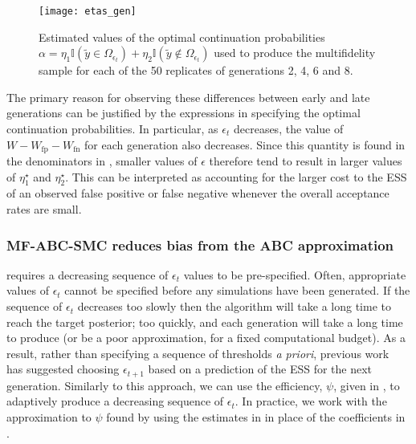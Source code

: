 \documentclass[12pt, onecolumn]{article}
\newcommand{\fp}[1]{#1_{\mathrm{fp}}}
\newcommand{\fn}[1]{#1_{\mathrm{fn}}}
\begin{document}
\begin{figure}
\centering
\texttt{[image: etas\_gen]}
\caption{
Estimated values of the optimal continuation probabilities $\alpha = \eta_1 \mathbb I(\tilde y \in \Omega_{\epsilon_t}) + \eta_2 \mathbb I(\tilde y \notin \Omega_{\epsilon_t})$ used to produce the multifidelity sample for each of the 50 replicates of generations 2, 4, 6 and 8.
}
\label{fig:etas}
\end{figure}

The primary reason for observing these differences between early and late generations can be justified by the expressions in  specifying the optimal continuation probabilities.
In particular, as $\epsilon_t$ decreases, the value of $W - \fp{W} - \fn{W}$ for each generation also decreases.
Since this quantity is found in the denominators in , smaller values of $\epsilon$ therefore tend to result in larger values of $\eta_1^\star$ and $\eta_2^\star$.
This can be interpreted as accounting for the larger cost to the ESS of an observed false positive or false negative whenever the overall acceptance rates are small.

\subsubsection{MF-ABC-SMC reduces bias from the ABC approximation}
\label{s:Adaptive}

 requires a decreasing sequence of $\epsilon_t$ values to be pre-specified.
Often, appropriate values of $\epsilon_t$ cannot be specified before any simulations have been generated.
If the sequence of $\epsilon_t$ decreases too slowly then the algorithm will take a long time to reach the target posterior; too quickly, and each generation will take a long time to produce (or be a poor approximation, for a fixed computational budget).
As a result, rather than specifying a sequence of thresholds \emph{a priori}, previous work~\cite{DelMoral2012} has suggested choosing $\epsilon_{t+1}$ based on a prediction of the ESS for the next generation.
Similarly to this approach, we can use the efficiency, $\psi$, given in , to adaptively produce a decreasing sequence of $\epsilon_t$.
In practice, we work with the approximation to $\psi$ found by using the estimates in  in place of the coefficients in .
\end{document}
